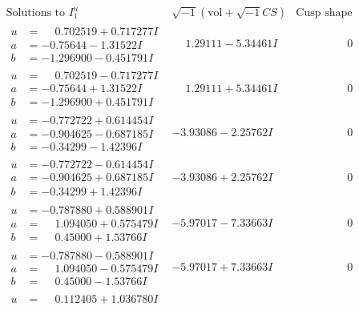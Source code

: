 \documentclass[1p]{elsarticle_modified}
\theoremstyle{definition}
\newcommand{\I}{\sqrt{-1}}
\begin{document}
$$\begin{array}{c|c|c}  
\text{Solutions to }I^u_{1}& \I (\text{vol} + \sqrt{-1}CS) & \text{Cusp shape}\\
 \hline 
\begin{aligned}
u &= \phantom{-}0.702519 + 0.717277 I \\
a &= -0.75644 - 1.31522 I \\
b &= -1.296900 - 0.451791 I\end{aligned}
 & \phantom{-}1.29111 - 5.34461 I & \phantom{-0.000000 } 0 \\ \hline\begin{aligned}
u &= \phantom{-}0.702519 - 0.717277 I \\
a &= -0.75644 + 1.31522 I \\
b &= -1.296900 + 0.451791 I\end{aligned}
 & \phantom{-}1.29111 + 5.34461 I & \phantom{-0.000000 } 0 \\ \hline\begin{aligned}
u &= -0.772722 + 0.614454 I \\
a &= -0.904625 - 0.687185 I \\
b &= -0.34299 - 1.42396 I\end{aligned}
 & -3.93086 - 2.25762 I & \phantom{-0.000000 } 0 \\ \hline\begin{aligned}
u &= -0.772722 - 0.614454 I \\
a &= -0.904625 + 0.687185 I \\
b &= -0.34299 + 1.42396 I\end{aligned}
 & -3.93086 + 2.25762 I & \phantom{-0.000000 } 0 \\ \hline\begin{aligned}
u &= -0.787880 + 0.588901 I \\
a &= \phantom{-}1.094050 + 0.575479 I \\
b &= \phantom{-}0.45000 + 1.53766 I\end{aligned}
 & -5.97017 - 7.33663 I & \phantom{-0.000000 } 0 \\ \hline\begin{aligned}
u &= -0.787880 - 0.588901 I \\
a &= \phantom{-}1.094050 - 0.575479 I \\
b &= \phantom{-}0.45000 - 1.53766 I\end{aligned}
 & -5.97017 + 7.33663 I & \phantom{-0.000000 } 0 \\ \hline\begin{aligned}
u &= \phantom{-}0.112405 + 1.036780 I \\

\end{aligned}
\end{array}$$
\end{document}
